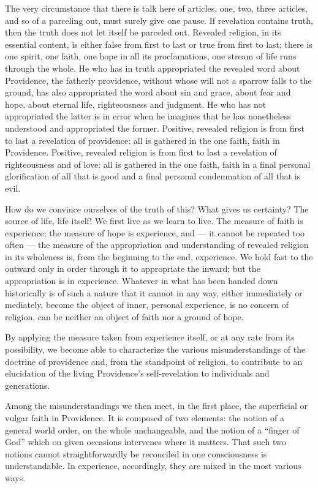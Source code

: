 \documentclass[12pt,a4paper,openany]{book}
\newcommand{\opage}[1]{\marginnote{\footnotesize\textit{[#1]}}}
\begin{document}
The very circumstance that there is talk here of articles, one, two, three articles, and so of a parceling out, must
surely give one pause. If revelation contains truth, then the truth does not let itself be parceled out. Revealed
religion, in its essential content, is either false from first to last or true from first to last; there is one
spirit, one faith, one hope in all its proclamations, one stream of life runs through the whole. He who has in truth
appropriated the revealed word about Providence, the fatherly providence, without whose will not a sparrow falls to
the ground, has also appropriated the word about sin and grace, about fear and hope, about eternal life,
righteousness and judgment. He who has not appropriated the latter is in error when he imagines that he has
nonetheless understood and appropriated the former. Positive, revealed religion is from first to last a revelation
of providence: all is gathered in the one faith, faith in Providence. Positive, revealed
\setcounter{footnote}{0}%
\opage{54}religion is from first to last a revelation of righteousness and of love: all is gathered in the one faith,
faith in a final personal glorification of all that is good and a final personal condemnation of all that is evil.

How do we convince ourselves of the truth of this? What gives us certainty? The source of life, life itself! We
first live as we learn to live. The measure of faith is experience; the measure of hope is experience, and --- it
cannot be repeated too often --- the measure of the appropriation and understanding of revealed religion in its
wholeness is, from the beginning to the end, experience. We hold fast to the outward only in order through it to
appropriate the inward; but the appropriation is in experience. Whatever in what has been handed down historically is
of such a nature that it cannot in any way, either immediately or mediately, become the object of inner, personal
experience, is no concern of religion, can be neither an object of faith nor a ground of hope.

By applying the measure taken from experience itself, or at any rate from its possibility, we become able to
characterize the various misunderstandings of the doctrine of providence and, from the standpoint of religion, to
contribute to an elucidation of the living Providence's self-revelation to individuals and generations.

Among the misunderstandings we then meet, in the first place, the superficial or vulgar faith in Providence. It is
composed of two elements: the notion of a general world order, on the whole unchangeable, and the notion of a
``finger of God'' which on given occasions intervenes where it matters. That such
\setcounter{footnote}{0}%
\opage{55}two notions cannot straightforwardly be reconciled in one consciousness is understandable. In experience,
accordingly, they are mixed in the most various ways.
\end{document}

